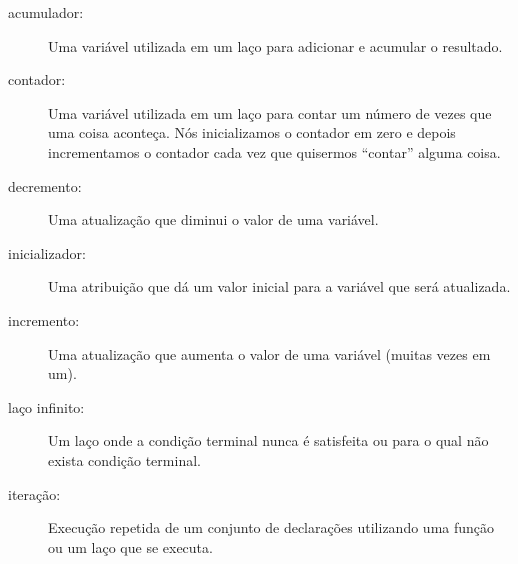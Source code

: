 \begin{description}

\item[acumulador:] Uma variável utilizada em um laço para adicionar e
	acumular o resultado.


\item[contador:] Uma variável utilizada em um laço para contar um número
	de vezes que uma coisa aconteça. Nós inicializamos o contador em zero e
	depois incrementamos o contador cada vez que quisermos ``contar'' alguma
	coisa.


\item[decremento:] Uma atualização que diminui o valor de uma variável.


\item[inicializador:] Uma atribuição que dá um valor inicial para a variável
	que será atualizada.


\item[incremento:] Uma atualização que aumenta o valor de uma variável (muitas
vezes em um).


\item[laço infinito:] Um laço onde a condição terminal nunca é satisfeita ou
	para o qual não exista condição terminal.

\item[iteração:] Execução repetida de um conjunto de declarações utilizando
	uma função ou um laço que se executa.

\end{description}


